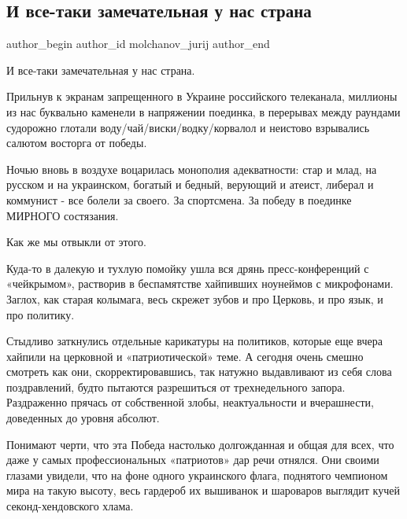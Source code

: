  
 
 
 
 
 
\subsection{И все-таки замечательная у нас страна}
\label{sec:26_09_2021.fb.molchanov_jurij.1.usik_strana_pobeda}
 
\ifcmt
 author_begin
   author_id molchanov_jurij
 author_end
\fi

И все-таки замечательная у нас страна.

Прильнув к экранам запрещенного в Украине российского телеканала, миллионы из
нас буквально каменели в напряжении поединка, в перерывах между раундами
судорожно глотали воду/чай/виски/водку/корвалол и неистово взрывались салютом
восторга от победы.

Ночью вновь в воздухе воцарилась монополия адекватности: стар и млад, на
русском и на украинском, богатый и бедный, верующий и атеист, либерал и
коммунист - все болели за своего. За спортсмена. За победу в поединке МИРНОГО
состязания.

Как же мы отвыкли от этого.

Куда-то в далекую и тухлую помойку ушла вся дрянь пресс-конференций с
«чейкрымом», растворив в беспамятстве хайпивших ноунеймов с микрофонами.
Заглох, как старая колымага, весь скрежет зубов и про Церковь, и про язык, и
про политику.

Стыдливо заткнулись отдельные карикатуры на политиков, которые еще вчера
хайпили на церковной и «патриотической» теме. А сегодня очень смешно смотреть
как они, скорректировавшись, так натужно выдавливают из себя слова
поздравлений, будто пытаются разрешиться от трехнедельного запора. Раздраженно
прячась от собственной злобы, неактуальности и вчерашнести, доведенных до
уровня абсолют.

Понимают черти, что эта Победа настолько долгожданная и общая для всех, что
даже у самых профессиональных «патриотов» дар речи отнялся. Они своими глазами
увидели, что на фоне одного украинского флага, поднятого чемпионом мира на
такую высоту, весь гардероб их вышиванок и шароваров выглядит кучей
секонд-хендовского хлама.

